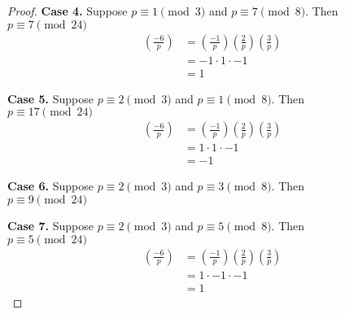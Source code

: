 \begin{proof}
\textbf{Case 4.}
Suppose $p \equiv 1 \pmod{3}$ and $p \equiv 7 \pmod{8}$. Then \\
$p \equiv 7 \pmod{24}$
\begin{align*}
\left( \frac{-6}{p} \right) 
&= \left( \frac{-1}{p} \right) \left( \frac{2}{p} \right) \left( \frac{3}{p} \right) \\
&= -1 \cdot 1 \cdot -1 \\
&= 1
\end{align*}

\textbf{Case 5.}
Suppose $p \equiv 2 \pmod{3}$ and $p \equiv 1 \pmod{8}$. Then \\
$p \equiv 17 \pmod{24}$
\begin{align*}
\left( \frac{-6}{p} \right) 
&= \left( \frac{-1}{p} \right) \left( \frac{2}{p} \right) \left( \frac{3}{p} \right) \\
&= 1 \cdot 1 \cdot -1 \\
&= -1
\end{align*}

\textbf{Case 6.}
Suppose $p \equiv 2 \pmod{3}$ and $p \equiv 3 \pmod{8}$. Then \\
$p \equiv 9 \pmod{24}$

\textbf{Case 7.}
Suppose $p \equiv 2 \pmod{3}$ and $p \equiv 5 \pmod{8}$. Then \\
$p \equiv 5 \pmod{24}$
\begin{align*}
\left( \frac{-6}{p} \right) 
&= \left( \frac{-1}{p} \right) \left( \frac{2}{p} \right) \left( \frac{3}{p} \right) \\
&= 1 \cdot -1 \cdot -1 \\
&= 1
\end{align*}
\end{proof}
